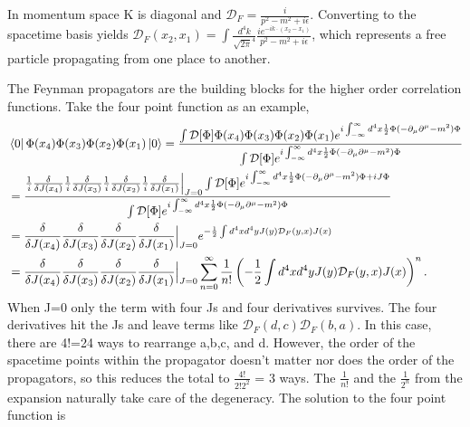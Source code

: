 \documentclass[12pt]{article}
\begin{document}
In momentum space K is diagonal and $\mathcal{D}_F = \frac{i}{p^2-m^2 + i\epsilon}$. Converting to the spacetime basis yields $\mathcal{D}_F(x_2,x_1) = \int \frac{d^4k}{\sqrt{2\pi}^4}\frac{i e^{-ik\cdot(x_2-x_1)}}{p^2-m^2 + i\epsilon}$, which represents a free particle propagating from one place to another.  

The Feynman propagators are the building blocks for the higher order correlation functions. Take the four point function as an example,
\begin{equation}
\begin{split}
&\bra{0}\Phi(x_4)\Phi(x_3)\Phi(x_2)\Phi(x_1)\ket{0} = 
\frac{\int \mathcal{D}[\Phi]\Phi(x_4)\Phi(x_3)\Phi(x_2)\Phi(x_1)e^{i\int_{-\infty}^{\infty} d^4x \frac{1}{2}\Phi (-\partial_\mu\partial^\mu - m^2)\Phi}}
{\int \mathcal{D}[\Phi]e^{i\int_{-\infty}^{\infty} d^4x \frac{1}{2}\Phi (-\partial_\mu\partial^\mu - m^2)\Phi}} \\
&= \frac{\frac{1}{i}\frac{\delta}{\delta J(x_4)}\frac{1}{i}\frac{\delta}{\delta J(x_3)}\frac{1}{i}\frac{\delta}{\delta J(x_2)}\frac{1}{i}\frac{\delta}{\delta J(x_1)}\Big|_{J=0}\int \mathcal{D}[\Phi]e^{i\int_{-\infty}^{\infty} d^4x \frac{1}{2}\Phi (-\partial_\mu\partial^\mu - m^2)\Phi + iJ\Phi}}
{\int \mathcal{D}[\Phi]e^{i\int_{-\infty}^{\infty} d^4x \frac{1}{2}\Phi (-\partial_\mu\partial^\mu - m^2)\Phi}} \\
&= \frac{\delta}{\delta J(x_4)}\frac{\delta}{\delta J(x_3)}\frac{\delta}{\delta J(x_2)}\frac{\delta}{\delta J(x_1)}\Big|_{J=0}e^{-\frac{1}{2}\int d^4x d^4y J(y) \mathcal{D}_F(y,x) J(x)} \\
&= \frac{\delta}{\delta J(x_4)}\frac{\delta}{\delta J(x_3)}\frac{\delta}{\delta J(x_2)}\frac{\delta}{\delta J(x_1)}\Big|_{J=0} 
\sum_{n=0}^\infty \frac{1}{n!}\left( -\frac{1}{2}\int d^4x d^4y J(y) \mathcal{D}_F(y,x) J(x) \right)^n. 
\end{split}
\end{equation}
When J=0 only the term with four Js and four derivatives survives. The four derivatives hit the Js and leave terms like $\mathcal{D}_F(d,c) \mathcal{D}_F(b,a)$. In this case, there are 4!=24 ways to rearrange a,b,c, and d. However, the order of the spacetime points within the propagator doesn't matter nor does the order of the propagators, so this reduces the total to $\frac{4!}{2!2^2}$ = 3 ways. The $\frac{1}{n!}$ and the $\frac{1}{2^n}$ from the expansion naturally take care of the degeneracy. The solution to the four point function is
\end{document}
